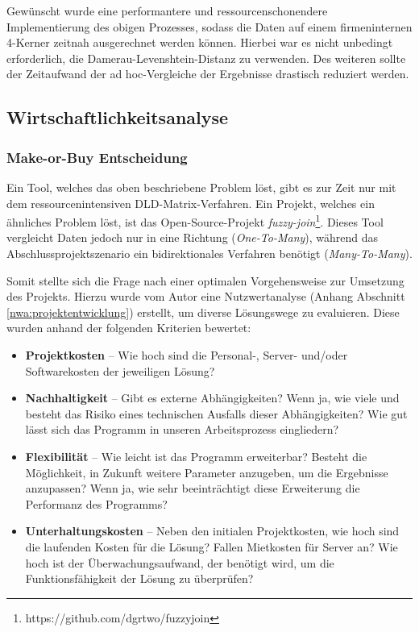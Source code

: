 Gewünscht wurde eine performantere und ressourcenschonendere Implementierung des obigen Prozesses,
sodass die Daten auf einem firmeninternen 4-Kerner zeitnah ausgerechnet werden können.
Hierbei war es nicht unbedingt erforderlich, die Damerau-Levenshtein-Distanz zu verwenden.
Des weiteren sollte der Zeitaufwand der ad hoc-Vergleiche der Ergebnisse drastisch reduziert werden.\par




\subsection{Wirtschaftlichkeitsanalyse}
\subsubsection{Make-or-Buy Entscheidung}
Ein Tool, welches das oben beschriebene Problem löst, gibt es zur Zeit nur mit dem
ressourcenintensiven DLD-Matrix-Verfahren. Ein Projekt, welches ein ähnliches
Problem löst, ist das Open-Source-Projekt \textit{fuzzy-join}\footnote{https://github.com/dgrtwo/fuzzyjoin}.
Dieses Tool vergleicht Daten jedoch nur in eine Richtung (\textit{One-To-Many}),
während das Abschlussprojektszenario ein bidirektionales Verfahren benötigt (\textit{Many-To-Many}).\par

Somit stellte sich die Frage nach einer optimalen Vorgehensweise zur Umsetzung des
Projekts. Hierzu wurde vom Autor eine Nutzwertanalyse (Anhang Abschnitt \ref{nwa:projektentwicklung}) erstellt, um diverse Lösungswege zu evaluieren.
Diese wurden anhand der folgenden Kriterien bewertet:


\begin{itemize}
    \item \textbf{Projektkosten} -- Wie hoch sind die Personal-, Server- und/oder Softwarekosten der jeweiligen Lösung?

    \item \textbf{Nachhaltigkeit} -- Gibt es externe Abhängigkeiten? Wenn ja, wie viele und besteht das Risiko eines technischen Ausfalls dieser Abhängigkeiten? Wie gut lässt sich das Programm in unseren Arbeitsprozess eingliedern?

    \item \textbf{Flexibilität} -- Wie leicht ist das Programm erweiterbar? Besteht die Möglichkeit, in Zukunft weitere Parameter anzugeben, um die Ergebnisse anzupassen? Wenn ja, wie sehr beeinträchtigt diese Erweiterung die Performanz des Programms?

    \item \textbf{Unterhaltungskosten} -- Neben den initialen Projektkosten, wie hoch sind die laufenden Kosten für die Lösung? Fallen Mietkosten für Server an? Wie hoch ist der Überwachungsaufwand, der benötigt wird, um die Funktionsfähigkeit der Lösung zu überprüfen?

\end{itemize}



